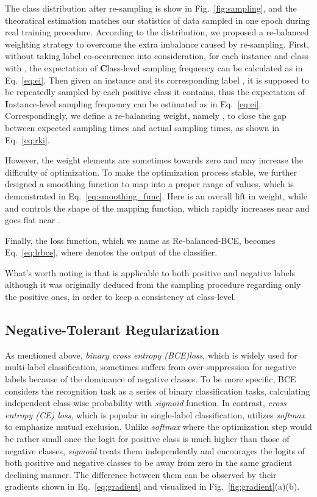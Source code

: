 \documentclass[runningheads]{llncs}
\begin{document}
The class distribution after re-sampling is show in Fig.~\ref{fig:sampling}, and the theoratical estimation matches our statistics of data sampled in one epoch during real training procedure. 
According to the distribution, we proposed a re-balanced weighting strategy to overcome the extra imbalance caused by re-sampling.
First, without taking label co-occurrence into consideration, for each instance  and class  with , the expectation of \textbf{C}lass-level sampling frequency can be calculated as  in Eq.~\ref{eq:ei}.
Then given an instance  and its corresponding label , it is supposed to be repeatedly sampled by each positive class  it contains, thus the expectation of \textbf{I}nstance-level sampling frequency can be estimated as  in Eq.~\ref{eq:ei}. Correspondingly, we define a re-balancing weight, namely , to close the gap between expected sampling times and actual sampling times, as shown in Eq.~\ref{eq:rki}.




However, the weight elements are sometimes towards zero and may increase the difficulty of optimization.
To make the optimization process stable, we further designed a smoothing function to map  into a proper range of values, which is demonstrated in Eq.~\ref{eq:smoothing_func}.
Here  is an overall lift in weight, while  and  controls the shape of the mapping function, which rapidly increases near  and goes flat near .

Finally, the loss function, which we name as Re-balanced-BCE, becomes Eq.~\ref{eq:lrbce}, where  denotes the output of the classifier.


What's worth noting is that  is applicable to both positive and negative labels although it was originally deduced from the sampling procedure regarding only the positive ones, 
in order to keep a consistency at class-level.

\subsection{Negative-Tolerant Regularization}
\label{subsec:regularization}

As mentioned above, \textit{binary cross entropy (BCE)loss}, which is widely used for multi-label classification,
sometimes suffers from over-suppression for negative labels because of the dominance of negative classes. 
To be more specific, BCE considers the recognition task as a series of binary classification tasks, calculating independent class-wise probability with \textit{sigmoid} function.
In contrast, \textit{cross entropy (CE) loss}, which is popular in single-label classification, utilizes \textit{softmax} to emphasize mutual exclusion.
Unlike \textit{softmax} where the optimization step would be rather small once the logit for positive class is much higher than those of negative classes, \textit{sigmoid} treats them independently and encourages the logits of both positive and negative classes to be away from zero in the same gradient declining manner. The difference between them can be observed by their gradients shown in Eq.~\ref{eq:gradient} and visualized in Fig.~\ref{fig:gradient}(a)(b).
\end{document}
